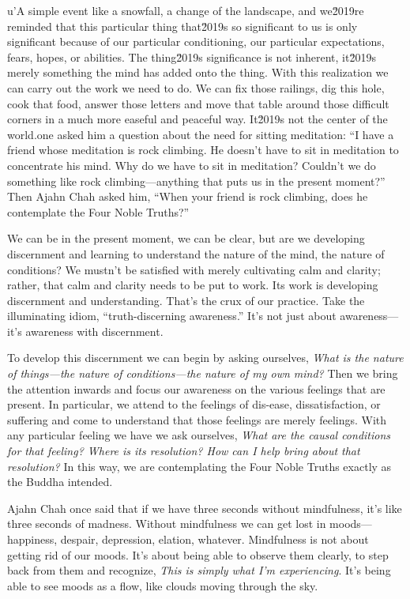 u'A simple event like a snowfall, a change of the landscape, and we\u2019re reminded that this particular thing that\u2019s so significant to us is only significant because of our particular conditioning, our particular expectations, fears, hopes, or abilities. The thing\u2019s significance is not inherent, it\u2019s merely something the mind has added onto the thing. With this realization we can carry out the work we need to do. We can fix those railings, dig this hole, cook that food, answer those letters and move that table around those difficult corners in a much more easeful and peaceful way. It\u2019s not the center of the world.one asked him a question 
about the need for sitting meditation: ``I have a friend whose 
meditation is rock climbing. He doesn't have to sit in meditation to 
concentrate his mind. Why do we have to sit in meditation? Couldn't we 
do something like rock climbing---anything that puts us in the present 
moment?'' Then Ajahn Chah asked him, ``When your friend is rock 
climbing, does he contemplate the Four Noble Truths?''

We can be in the present moment, we can be clear, but are we developing 
discernment and learning to understand the nature of the mind, the 
nature of conditions? We mustn't be satisfied with merely cultivating 
calm and clarity; rather, that calm and clarity needs to be put to 
work. Its work is developing discernment and understanding. That's the 
crux of our practice. Take the illuminating idiom, ``truth-discerning 
awareness.'' It's not just about awareness---it's awareness with 
discernment.

To develop this discernment we can begin by asking ourselves, 
\emph{What is the nature of things---the nature of conditions---the 
nature of my own mind?} Then we bring the attention inwards and focus 
our awareness on the various feelings that are present. In particular, 
we attend to the feelings of dis-ease, dissatisfaction, or suffering 
and come to understand that those feelings are merely feelings. With 
any particular feeling we have we ask ourselves, \emph{What are the 
causal conditions for that feeling? Where is its resolution? How can I 
help bring about that resolution?} In this way, we are contemplating 
the Four Noble Truths exactly as the Buddha intended.


Ajahn Chah once said that if we have three seconds without mindfulness, 
it's like three seconds of madness. Without mindfulness we can get lost 
in moods---happiness, despair, depression, elation, whatever. 
Mindfulness is not about getting rid of our moods. It's about being 
able to observe them clearly, to step back from them and recognize, 
\emph{This is simply what I'm experiencing}. It's being able to see 
moods as a flow, like clouds moving through the sky.

